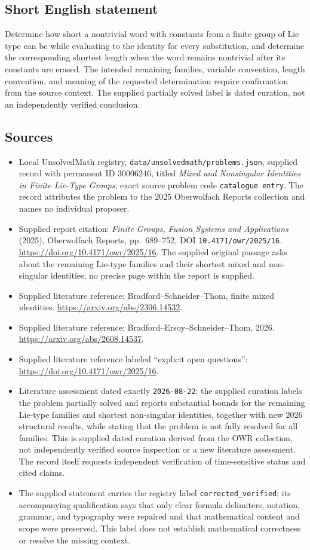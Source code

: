 \documentclass[11pt]{article}
\begin{document}
\subsection{Short English statement}
Determine how short a nontrivial word with constants from a finite group of Lie type can be while evaluating to the identity for every substitution, and determine the corresponding shortest length when the word remains nontrivial after its constants are erased. The intended remaining families, variable convention, length convention, and meaning of the requested determination require confirmation from the source context. The supplied partially solved label is dated curation, not an independently verified conclusion.
\subsection{Sources}
\begin{itemize}
\item Local UnsolvedMath registry, \texttt{data/unsolvedmath/problems.json}, supplied record with permanent ID \(30006246\), titled \emph{Mixed and Nonsingular Identities in Finite Lie-Type Groups}; exact source problem code \texttt{catalogue entry}. The record attributes the problem to the 2025 Oberwolfach Reports collection and names no individual proposer.
\item Supplied report citation: \emph{Finite Groups, Fusion Systems and Applications} (2025), Oberwolfach Reports, pp.\ 689--752, DOI \texttt{10.4171/owr/2025/16}. \url{https://doi.org/10.4171/owr/2025/16}. The supplied original passage asks about the remaining Lie-type families and their shortest mixed and non-singular identities; no precise page within the report is supplied.
\item Supplied literature reference: Bradford--Schneider--Thom, finite mixed identities. \url{https://arxiv.org/abs/2306.14532}.
\item Supplied literature reference: Bradford--Ersoy--Schneider--Thom, 2026. \url{https://arxiv.org/abs/2608.14537}.
\item Supplied literature reference labeled ``explicit open questions'': \url{https://doi.org/10.4171/owr/2025/16}.
\item Literature assessment dated exactly \texttt{2026-08-22}: the supplied curation labels the problem partially solved and reports substantial bounds for the remaining Lie-type families and shortest non-singular identities, together with new 2026 structural results, while stating that the problem is not fully resolved for all families. This is supplied dated curation derived from the OWR collection, not independently verified source inspection or a new literature assessment. The record itself requests independent verification of time-sensitive status and cited claims.
\item The supplied statement carries the registry label \texttt{corrected\_verified}; its accompanying qualification says that only clear formula delimiters, notation, grammar, and typography were repaired and that mathematical content and scope were preserved. This label does not establish mathematical correctness or resolve the missing context.
\end{itemize}
\end{document}
